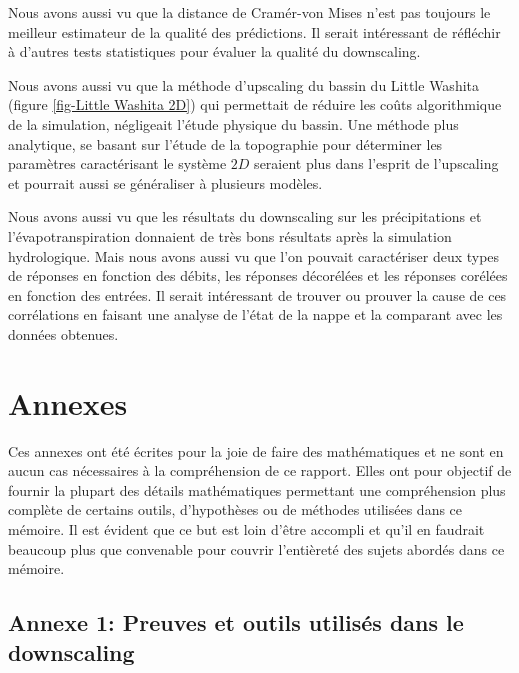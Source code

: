 \documentclass[a4paper,11pt]{article}
\numberwithin{equation}{section}
\begin{document}
Nous avons aussi vu que la distance de Cramér-von Mises n'est pas toujours le meilleur estimateur de la qualité des prédictions. Il serait intéressant de réfléchir à d'autres tests statistiques pour évaluer la qualité du downscaling. 

Nous avons aussi vu que la méthode d'upscaling du bassin du Little Washita (figure \ref{fig-Little Washita 2D}) qui permettait de réduire les coûts algorithmique de la simulation, négligeait l'étude physique du bassin. Une méthode plus analytique, se basant sur l'étude de la topographie pour déterminer les paramètres caractérisant le système $2D$ seraient plus dans l'esprit de l'upscaling et pourrait aussi se généraliser à plusieurs modèles.

Nous avons aussi vu que les résultats du downscaling sur les précipitations et l'évapotranspiration donnaient de très bons résultats après la simulation hydrologique. Mais nous avons aussi vu que l'on pouvait caractériser deux types de réponses en fonction des débits, les réponses décorélées et les réponses corélées en fonction des entrées. Il serait intéressant de trouver ou prouver la cause de ces corrélations en faisant une analyse de l'état de la nappe et la comparant avec les données obtenues. 



\newpage
\section{Annexes}

Ces annexes ont été écrites pour la joie de faire des mathématiques et ne sont en aucun cas nécessaires à la compréhension de ce rapport. Elles ont pour objectif de fournir la plupart des détails mathématiques permettant une compréhension plus complète de certains outils, d'hypothèses ou de méthodes utilisées dans ce mémoire. Il est évident que ce but est loin d'être accompli et qu'il en faudrait beaucoup plus que convenable pour couvrir l'entièreté des sujets abordés dans ce mémoire.
 
\subsection{Annexe 1: Preuves et outils utilisés dans le downscaling}
\label{ch:outils-mathematiques}
\end{document}
